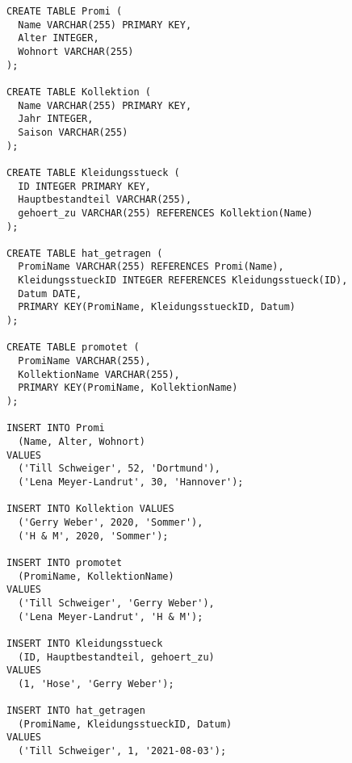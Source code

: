 \documentclass{lehramt-informatik-aufgabe}
\begin{document}
\begin{verbatim}
CREATE TABLE Promi (
  Name VARCHAR(255) PRIMARY KEY,
  Alter INTEGER,
  Wohnort VARCHAR(255)
);

CREATE TABLE Kollektion (
  Name VARCHAR(255) PRIMARY KEY,
  Jahr INTEGER,
  Saison VARCHAR(255)
);

CREATE TABLE Kleidungsstueck (
  ID INTEGER PRIMARY KEY,
  Hauptbestandteil VARCHAR(255),
  gehoert_zu VARCHAR(255) REFERENCES Kollektion(Name)
);

CREATE TABLE hat_getragen (
  PromiName VARCHAR(255) REFERENCES Promi(Name),
  KleidungsstueckID INTEGER REFERENCES Kleidungsstueck(ID),
  Datum DATE,
  PRIMARY KEY(PromiName, KleidungsstueckID, Datum)
);

CREATE TABLE promotet (
  PromiName VARCHAR(255),
  KollektionName VARCHAR(255),
  PRIMARY KEY(PromiName, KollektionName)
);

INSERT INTO Promi
  (Name, Alter, Wohnort)
VALUES
  ('Till Schweiger', 52, 'Dortmund'),
  ('Lena Meyer-Landrut', 30, 'Hannover');

INSERT INTO Kollektion VALUES
  ('Gerry Weber', 2020, 'Sommer'),
  ('H & M', 2020, 'Sommer');

INSERT INTO promotet
  (PromiName, KollektionName)
VALUES
  ('Till Schweiger', 'Gerry Weber'),
  ('Lena Meyer-Landrut', 'H & M');

INSERT INTO Kleidungsstueck
  (ID, Hauptbestandteil, gehoert_zu)
VALUES
  (1, 'Hose', 'Gerry Weber');

INSERT INTO hat_getragen
  (PromiName, KleidungsstueckID, Datum)
VALUES
  ('Till Schweiger', 1, '2021-08-03');
\end{verbatim}
\end{document}
